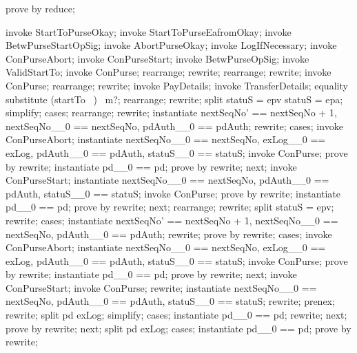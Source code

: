 \begin{LPScript}\begin{zproof}[rReqStartToPayDetailsInMessage]
    prove by reduce;
\end{zproof}\end{LPScript}

\begin{LPScript}\begin{zproof}[tStartToEafromOkayPRE]
    invoke StartToPurseOkay;
    invoke StartToPurseEafromOkay;
    invoke BetwPurseStartOpSig;
    invoke AbortPurseOkay;
    invoke LogIfNecessary;
    invoke \Xi ConPurseAbort;
    invoke \Xi ConPurseStart;
    invoke BetwPurseOpSig;
    invoke ValidStartTo;
    invoke \Delta ConPurse;
    rearrange;
    rewrite;
    rearrange;
    rewrite;
    invoke ConPurse;
    rearrange;
    rewrite;
    invoke PayDetails;
    invoke TransferDetails;
    equality substitute (startTo~ \inv)~ m?;
    rearrange;
    rewrite;
    split \lnot statuS = epv \land \lnot statuS = epa;
    simplify;
    cases;
    rearrange;
    rewrite;
    instantiate nextSeqNo' == nextSeqNo + 1, nextSeqNo\_\_0 == nextSeqNo,
        pdAuth\_\_0 == pdAuth;
    rewrite;
    cases;
    invoke ConPurseAbort;
    instantiate nextSeqNo\_\_0 == nextSeqNo, exLog\_\_0 == exLog,
        pdAuth\_\_0 == pdAuth, statuS\_\_0 == statuS;
    invoke ConPurse;
    prove by rewrite;
    instantiate pd\_\_0 == pd;
    prove by rewrite;
    next;
    invoke ConPurseStart;
    instantiate nextSeqNo\_\_0 == nextSeqNo, pdAuth\_\_0 == pdAuth,
        statuS\_\_0 == statuS;
    invoke ConPurse;
    prove by rewrite;
    instantiate pd\_\_0 == pd;
    prove by rewrite;
    next;
    rearrange;
    rewrite;
    split statuS = epv;
    rewrite;
    cases;
    instantiate nextSeqNo' == nextSeqNo + 1, nextSeqNo\_\_0 == nextSeqNo,
        pdAuth\_\_0 == pdAuth;
    rewrite;
    prove by rewrite;
    cases;
    invoke ConPurseAbort;
    instantiate nextSeqNo\_\_0 == nextSeqNo, exLog\_\_0 == exLog,
        pdAuth\_\_0 == pdAuth, statuS\_\_0 == statuS;
    invoke ConPurse;
    prove by rewrite;
    instantiate pd\_\_0 == pd;
    prove by rewrite;
    next;
    invoke ConPurseStart;
    invoke ConPurse;
    rewrite;
    instantiate nextSeqNo\_\_0 == nextSeqNo, pdAuth\_\_0 == pdAuth,
        statuS\_\_0 == statuS;
    rewrite;
    prenex;
    rewrite;
    split pd \in exLog;
    simplify;
    cases;
    instantiate pd\_\_0 == pd;
    rewrite;
    next;
    prove by rewrite;
    next;
    split pd \in exLog;
    cases;
    instantiate pd\_\_0 == pd;
    prove by rewrite;

\end{zproof}
\end{LPScript}
